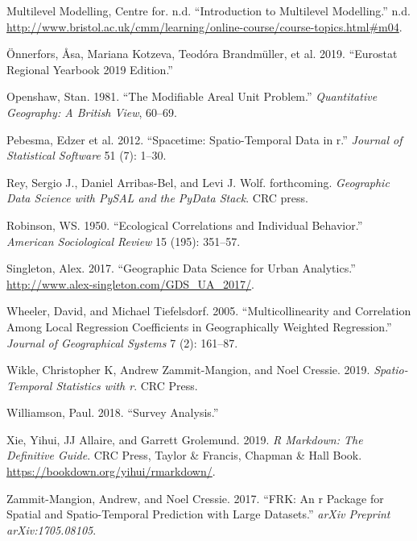 \documentclass[
  letterpaper,
  krantz2]{style/krantz}
\newlength{\cslhangindent}
\newlength{\cslentryspacingunit} %
\newenvironment{CSLReferences}[2] %
 {%
  \setlength{\parindent}{0pt}
  \ifodd #1
  \let\oldpar\par
  \def\par{\hangindent=\cslhangindent\oldpar}
  \fi
  \setlength{\parskip}{#2\cslentryspacingunit}
 }%
 {}
\begin{document}
\begin{CSLReferences}{1}{0}
\leavevmode{}%
Multilevel Modelling, Centre for. n.d. {``Introduction to Multilevel
Modelling.''} n.d.
\url{http://www.bristol.ac.uk/cmm/learning/online-course/course-topics.html\#m04}.

\leavevmode{}%
Önnerfors, Åsa, Mariana Kotzeva, Teodóra Brandmüller, et al. 2019.
{``Eurostat Regional Yearbook 2019 Edition.''}

\leavevmode{}%
Openshaw, Stan. 1981. {``The Modifiable Areal Unit Problem.''}
\emph{Quantitative Geography: A British View}, 60--69.

\leavevmode{}%
Pebesma, Edzer et al. 2012. {``Spacetime: Spatio-Temporal Data in r.''}
\emph{Journal of Statistical Software} 51 (7): 1--30.

\leavevmode{}%
Rey, Sergio J., Daniel Arribas-Bel, and Levi J. Wolf. forthcoming.
\emph{Geographic Data Science with PySAL and the PyData Stack}. CRC
press.

\leavevmode{}%
Robinson, WS. 1950. {``Ecological Correlations and Individual
Behavior.''} \emph{American Sociological Review} 15 (195): 351--57.

\leavevmode{}%
Singleton, Alex. 2017. {``Geographic Data Science for Urban
Analytics.''} \url{http://www.alex-singleton.com/GDS_UA_2017/}.

\leavevmode{}%
Wheeler, David, and Michael Tiefelsdorf. 2005. {``Multicollinearity and
Correlation Among Local Regression Coefficients in Geographically
Weighted Regression.''} \emph{Journal of Geographical Systems} 7 (2):
161--87.

\leavevmode{}%
Wikle, Christopher K, Andrew Zammit-Mangion, and Noel Cressie. 2019.
\emph{Spatio-Temporal Statistics with r}. CRC Press.

\leavevmode{}%
Williamson, Paul. 2018. {``Survey Analysis.''}

\leavevmode{}%
Xie, Yihui, JJ Allaire, and Garrett Grolemund. 2019. \emph{R Markdown:
The Definitive Guide}. CRC Press, Taylor \& Francis, Chapman \& Hall
Book. \url{https://bookdown.org/yihui/rmarkdown/}.

\leavevmode{}%
Zammit-Mangion, Andrew, and Noel Cressie. 2017. {``FRK: An r Package for
Spatial and Spatio-Temporal Prediction with Large Datasets.''}
\emph{arXiv Preprint arXiv:1705.08105}.

\end{CSLReferences}



\printindex
\end{document}
